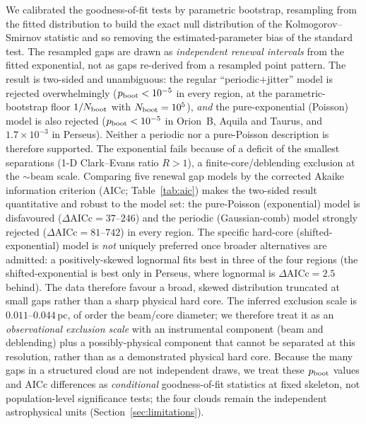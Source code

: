\documentclass[usenatbib,twoside,twocolumn]{mnras}
\begin{document}
We calibrated the goodness-of-fit tests by parametric bootstrap, resampling from the fitted distribution to build the exact null distribution of the Kolmogorov--Smirnov statistic and so removing the estimated-parameter bias of the standard test. The resampled gaps are drawn as \emph{independent renewal intervals} from the fitted exponential, not as gaps re-derived from a resampled point pattern. The result is two-sided and unambiguous: the regular ``periodic$+$jitter'' model is rejected overwhelmingly ($p_{\rm boot}<10^{-5}$ in every region, at the parametric-bootstrap floor $1/N_{\rm boot}$ with $N_{\rm boot}=10^5$), \emph{and} the pure-exponential (Poisson) model is also rejected ($p_{\rm boot}<10^{-5}$ in Orion~B, Aquila and Taurus, and $1.7\times10^{-3}$ in Perseus). Neither a periodic nor a pure-Poisson description is therefore supported. The exponential fails because of a deficit of the smallest separations (1-D Clark--Evans ratio $R>1$), a finite-core/deblending exclusion at the $\sim$beam scale. Comparing five renewal gap models by the corrected Akaike information criterion (AICc; Table~\ref{tab:aic}) makes the two-sided result quantitative and robust to the model set: the pure-Poisson (exponential) model is disfavoured ($\Delta$AICc$=37$--$246$) and the periodic (Gaussian-comb) model strongly rejected ($\Delta$AICc$=81$--$742$) in every region. The specific hard-core (shifted-exponential) model is \emph{not} uniquely preferred once broader alternatives are admitted: a positively-skewed lognormal fits best in three of the four regions (the shifted-exponential is best only in Perseus, where lognormal is $\Delta$AICc$=2.5$ behind). The data therefore favour a broad, skewed distribution truncated at small gaps rather than a sharp physical hard core. The inferred exclusion scale is $0.011$--$0.044$\,pc, of order the beam/core diameter; we therefore treat it as an \emph{observational exclusion scale} with an instrumental component (beam and deblending) plus a possibly-physical component that cannot be separated at this resolution, rather than as a demonstrated physical hard core. Because the many gaps in a structured cloud are not independent draws, we treat these $p_{\rm boot}$ values and AICc differences as \emph{conditional} goodness-of-fit statistics at fixed skeleton, not population-level significance tests; the four clouds remain the independent astrophysical units (Section~\ref{sec:limitations}).
\end{document}
